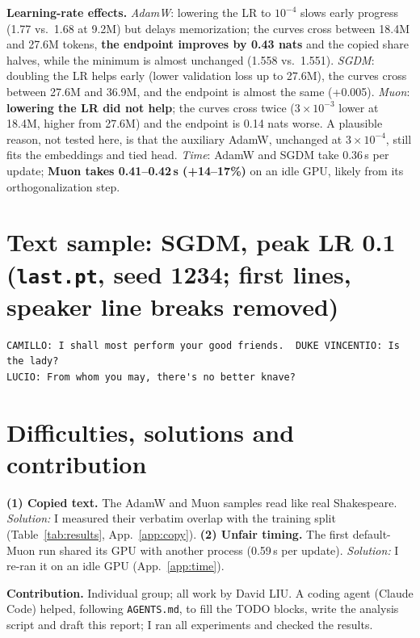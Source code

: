 \documentclass[10pt]{article}
\newcommand{\key}[1]{\textbf{#1}}
\begin{document}
\textbf{Learning-rate effects.} \emph{AdamW}: lowering the LR to $10^{-4}$ slows early progress (1.77 vs.\ 1.68 at 9.2M) but delays memorization; the curves cross between 18.4M and 27.6M tokens, \key{the endpoint improves by 0.43 nats} and the copied share halves, while the minimum is almost unchanged (1.558 vs.\ 1.551). \emph{SGDM}: doubling the LR helps early (lower validation loss up to 27.6M), the curves cross between 27.6M and 36.9M, and the endpoint is almost the same (+0.005). \emph{Muon}: \key{lowering the LR did not help}; the curves cross twice ($3\times10^{-3}$ lower at 18.4M, higher from 27.6M) and the endpoint is 0.14 nats worse. A plausible reason, not tested here, is that the auxiliary AdamW, unchanged at $3\times10^{-4}$, still fits the embeddings and tied head. \emph{Time}: AdamW and SGDM take 0.36\,s per update; \key{Muon takes 0.41--0.42\,s (+14--17\%)} on an idle GPU, likely from its orthogonalization step.

\section{Text sample: SGDM, peak LR 0.1 (\texttt{last.pt}, seed 1234; first lines, speaker line breaks removed)}
\vspace{-4pt}
{\small\begin{verbatim}
CAMILLO: I shall most perform your good friends.  DUKE VINCENTIO: Is the lady?
LUCIO: From whom you may, there's no better knave?
\end{verbatim}}
\vspace{-14pt}

\section{Difficulties, solutions and contribution}
\textbf{(1) Copied text.} The AdamW and Muon samples read like real Shakespeare. \emph{Solution:} I measured their verbatim overlap with the training split (Table~\ref{tab:results}, App.~\ref{app:copy}). \textbf{(2) Unfair timing.} The first default-Muon run shared its GPU with another process (0.59\,s per update). \emph{Solution:} I re-ran it on an idle GPU (App.~\ref{app:time}).

\textbf{Contribution.} Individual group; all work by David LIU. A coding agent (Claude Code) helped, following \texttt{AGENTS.md}, to fill the TODO blocks, write the analysis script and draft this report; I ran all experiments and checked the results.

\label{end-main}
\clearpage
\appendix
\renewcommand{\thesection}{\Alph{section}}
\end{document}
